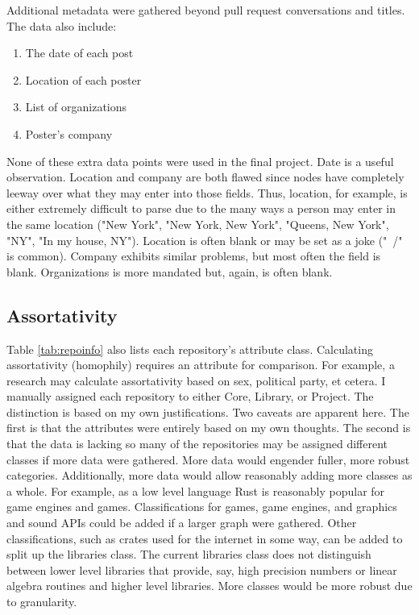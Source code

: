 \documentclass[12pt, a4paper]{article}
\begin{document}
Additional metadata were gathered beyond pull request conversations and titles. The data also include:
\begin{enumerate}
    \item The date of each post
    \item Location of each poster
    \item List of organizations
    \item Poster's company
\end{enumerate}
None of these extra data points were used in the final project. Date is a useful observation. Location and company are both flawed since nodes have completely leeway over what they may enter into those fields. Thus, location, for example, is either extremely difficult to parse due to the many ways a person may enter in the same location ("New York", "New York, New York", "Queens, New York", "NY", "In my house, NY"). Location is often blank or may be set as a joke ("~/" is common). Company exhibits similar problems, but most often the field is blank. Organizations is more mandated but, again, is often blank.

\subsection{Assortativity}
Table \ref{tab:repoinfo} also lists each repository's attribute class. Calculating assortativity (homophily) requires an attribute for comparison. For example, a research may calculate assortativity based on sex, political party, et cetera. I manually assigned each repository to either Core, Library, or Project. The distinction is based on my own justifications. Two caveats are apparent here. The first is that the attributes were entirely based on my own thoughts. The second is that the data is lacking so many of the repositories may be assigned different classes if more data were gathered. More data would engender fuller, more robust categories. Additionally, more data would allow reasonably adding more classes as a whole. For example, as a low level language Rust is reasonably popular for game engines and games. Classifications for games, game engines, and graphics and sound APIs could be added if a larger graph were gathered. Other classifications, such as crates used for the internet in some way, can be added to split up the libraries class. The current libraries class does not distinguish between lower level libraries that provide, say, high precision numbers or linear algebra routines and higher level libraries. More classes would be more robust due to granularity.
\end{document}
